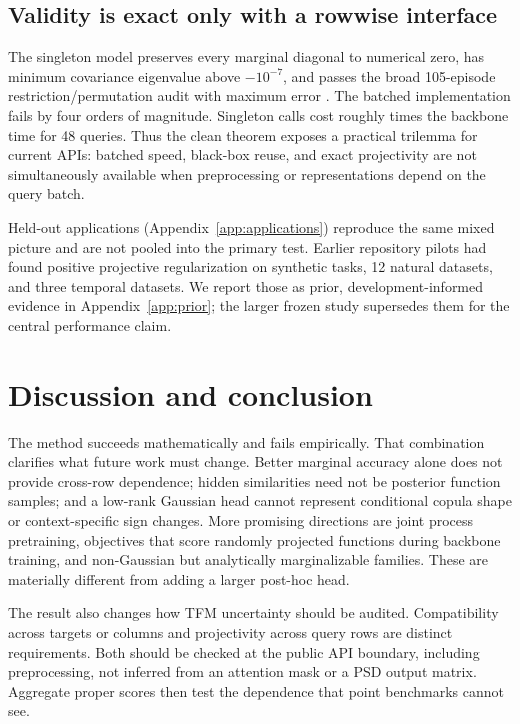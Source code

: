 \documentclass{article}
\begin{document}
\subsection{Validity is exact only with a rowwise interface}

The singleton model preserves every marginal diagonal to numerical zero, has
minimum covariance eigenvalue above $-10^{-7}$, and passes the broad 105-episode
restriction/permutation audit with maximum error \SingletonAuditMax{}.  The
batched implementation fails by four orders of magnitude.  Singleton calls
cost roughly \SingletonSlowdown{} times the backbone time for 48 queries.
Thus the clean theorem exposes a practical trilemma for current APIs:
batched speed, black-box reuse, and exact projectivity are not simultaneously
available when preprocessing or representations depend on the query batch.

Held-out applications (Appendix~\ref{app:applications}) reproduce the same
mixed picture and are not pooled into the primary test.  Earlier repository
pilots had found positive projective regularization on synthetic tasks,
12 natural datasets, and three temporal datasets.  We report those as prior,
development-informed evidence in Appendix~\ref{app:prior}; the larger frozen
study supersedes them for the central performance claim.

\section{Discussion and conclusion}

The method succeeds mathematically and fails empirically.  That combination
clarifies what future work must change.  Better marginal accuracy alone does
not provide cross-row dependence; hidden similarities need not be posterior
function samples; and a low-rank Gaussian head cannot represent conditional
copula shape or context-specific sign changes.  More promising directions are
joint process pretraining, objectives that score randomly projected functions
during backbone training, and non-Gaussian but analytically marginalizable
families.  These are materially different from adding a larger post-hoc head.

The result also changes how TFM uncertainty should be audited.  Compatibility
across targets or columns \citep{klotergens2026agree} and projectivity across
query rows are distinct requirements.  Both should be checked at the public
API boundary, including preprocessing, not inferred from an attention mask or
a PSD output matrix.  Aggregate proper scores then test the dependence that
point benchmarks cannot see.
\end{document}

